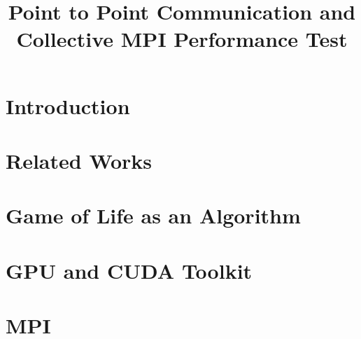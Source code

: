 \documentclass[sigconf,authordraft]{acmart}
\begin{document}
\title{Point to Point Communication and Collective MPI Performance Test}



\renewcommand{\shortauthors}{Yitao Shen, et al.}

\begin{abstract}
  
\end{abstract}



\maketitle

\section{Introduction}



\section{Related Works}


\section{Game of Life as an Algorithm}



\section{GPU and CUDA Toolkit}



\section{MPI}

\end{document}
